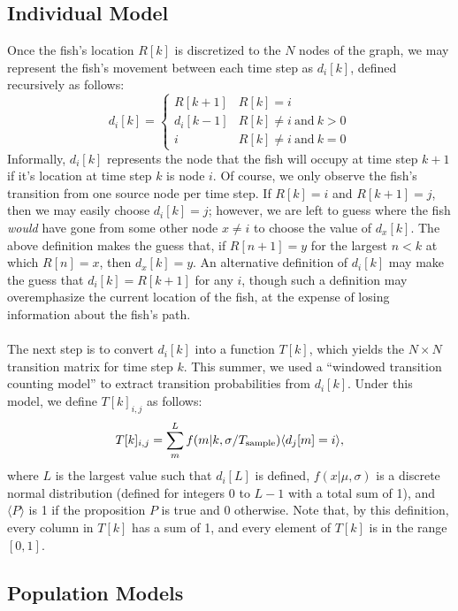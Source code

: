 \documentclass[11pt,letterpaper]{article}
\begin{document}
	\subsection{Individual Model}
	
	Once the fish's location $R[k]$ is discretized to the $N$ nodes of the graph, we may represent the fish's movement between each time step as $d_i[k]$, defined recursively as follows:
	\[
		d_i[k] = \left\{
			\begin{array}{ll}
				R[k + 1] & R[k] = i \\
				d_i[k - 1] & R[k] \ne i ~\text{and}~ k > 0 \\
				i & R[k] \ne i ~\text{and}~ k = 0
			\end{array}
		\right.
	\] 
	Informally, $d_i[k]$ represents the node that the fish will occupy at time step $k + 1$ if it's location at time step $k$ is node $i$. Of course, we only observe the fish's transition from one source node per time step. If $R[k] = i$ and $R[k + 1] = j$, then we may easily choose $d_i[k] = j$; however, we are left to guess where the fish \textit{would} have gone from some other node $x \ne i$ to choose the value of $d_x[k]$. The above definition makes the guess that, if $R[n + 1] = y$ for the largest $n < k$ at which $R[n] = x$, then $d_x[k] = y$. An alternative definition of $d_i[k]$ may make the guess that $d_i[k] = R[k + 1]$ for any $i$, though such a definition may overemphasize the current location of the fish, at the expense of losing information about the fish's path.
	\\\\
	The next step is to convert $d_i[k]$ into a function $T[k]$, which yields the $N \times N$ transition matrix for time step $k$. This summer, we used a ``windowed transition counting model'' to extract transition probabilities from $d_i[k]$. Under this model, we define $T[k]_{i,j}$ as follows:
	\[
		T[k]_{i, j} = \sum_m^L f(m | k, \sigma / T_{\rm sample}) \langle d_j[m] = i \rangle,
	\]
	where $L$ is the largest value such that $d_i[L]$ is defined, $f(x | \mu, \sigma)$ is a discrete normal distribution (defined for integers 0 to $L - 1$ with a total sum of 1), and $\langle P \rangle$ is 1 if the proposition $P$ is true and 0 otherwise. Note that, by this definition, every column in $T[k]$ has a sum of 1, and every element of $T[k]$ is in the range $[0, 1]$.
	
	\subsection{Population Models}
	
\end{document}
